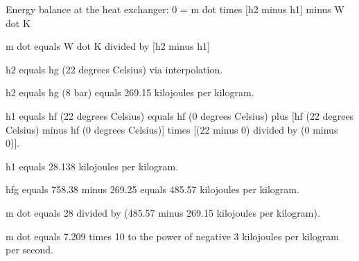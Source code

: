 Energy balance at the heat exchanger:  
0 = m dot times [h2 minus h1] minus W dot K  

m dot equals W dot K divided by [h2 minus h1]  

h2 equals hg (22 degrees Celsius) via interpolation.  

h2 equals hg (8 bar) equals 269.15 kilojoules per kilogram.  

h1 equals hf (22 degrees Celsius) equals hf (0 degrees Celsius) plus [hf (22 degrees Celsius) minus hf (0 degrees Celsius)] times [(22 minus 0) divided by (0 minus 0)].  

h1 equals 28.138 kilojoules per kilogram.  

hfg equals 758.38 minus 269.25 equals 485.57 kilojoules per kilogram.  

m dot equals 28 divided by (485.57 minus 269.15 kilojoules per kilogram).  

m dot equals 7.209 times 10 to the power of negative 3 kilojoules per kilogram per second.